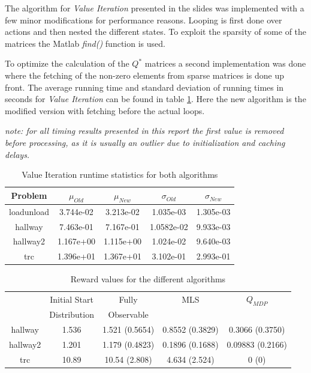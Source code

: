 \documentclass[10pt,a4paper]{article}
\begin{document}
The algorithm for \emph{Value Iteration} presented in the slides was implemented with a few minor modifications for performance reasons. 
Looping is first done over actions and then nested the different states. To exploit the sparsity of some of the matrices the Matlab \emph{find()} function is used.

To optimize the calculation of the $Q^{*}$ matrices a second implementation was done where the fetching of the non-zero elements from sparse matrices is done up front. 
The average running time and standard deviation of running times in seconds for \emph{Value Iteration} can be found in table \ref{table:vi}.
Here the new algorithm is the modified version with fetching before the actual loops.
\begin{framed}
\textit{note: for all timing results presented in this report the first value is removed before processing, as it is usually an outlier due to initialization and caching delays.}
\end{framed}
\newpage


\begin{table}
\centering
\begin{tabular}{ c || c | c || c | c}
Problem & $\mu_{Old}$ & $\mu_{New}$ & $\sigma_{Old}$ & $\sigma_{New}$ \\
\hline
loadunload & 3.744e-02 & 3.213e-02 & 1.035e-03 & 1.305e-03\\
hallway & 7.463e-01 & 7.167e-01 & 1.0582e-02 & 9.933e-03\\
hallway2 & 1.167e+00 & 1.115e+00 & 1.024e-02 & 9.640e-03 \\
trc & 1.396e+01 & 1.367e+01 & 3.102e-01 & 2.993e-01\\
\end{tabular}
\caption{Value Iteration runtime statistics for both algorithms}
\label{table:vi}
\end{table}

\begin{table}
\centering
\begin{tabular}{ c || c | c | c | c }
\hfill & Initial Start & Fully & MLS & $Q_{MDP}$\\
\hfill & Distribution &  Observable &  & \\
\hline
hallway & 1.536 & 1.521 (0.5654) & 0.8552 (0.3829) & 0.3066 (0.3750) \\
hallway2 & 1.201 & 1.179 (0.4823) & 0.1896 (0.1688) & 0.09883 (0.2166)\\
trc & 10.89 & 10.54 (2.808) & 4.634 (2.524) & 0 (0)
\\
\end{tabular}
\caption{Reward values for the different algorithms}
\label{table:rewards}
\end{table}
\end{document}

